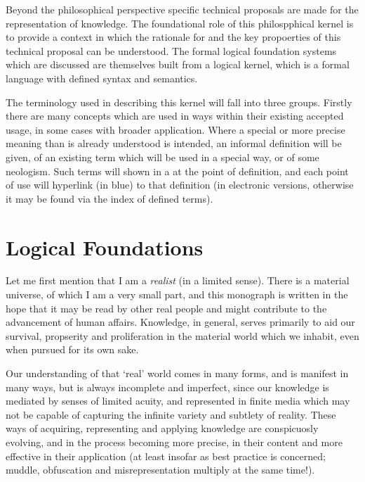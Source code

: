 Beyond the philosophical perspective specific technical proposals are made for the representation of knowledge.
The foundational role of this philospphical kernel is to provide a context in which the rationale for and the key propoerties of this technical proposal can be understood.
The formal logical foundation systems which are discussed are themselves built from a logical kernel, which is a formal language with defined syntax and semantics.

The terminology used in describing this kernel will fall into three 
groups.
Firstly there are many concepts which are used in ways within their existing accepted usage, in some cases with broader application.
Where a special or more precise meaning than is already understood   is intended, an informal definition will be given, of an existing term which will be used in a special way, or of some neologism.
Such terms will shown in a  at the point of definition, and each point of use will hyperlink (in blue) to that definition (in electronic versions, otherwise it may be found via the index of defined terms).

\section{Logical Foundations}

Let me first mention that I am a \emph{realist} (in a limited sense).
There is a material universe, of which I am a very small part, and this monograph is written in the hope that it may be read by other real people and might contribute to the advancement of human affairs.
Knowledge, in general, serves primarily to aid our survival, propserity and proliferation in the material world which we inhabit, even when pursued for its own sake.

Our understanding of that `real'%
world comes in many forms, and is manifest in many ways, but is always incomplete and imperfect, since our knowledge is mediated by senses of limited acuity, and represented in finite media which may not be capable of capturing the infinite variety and subtlety of reality.
These ways of acquiring, representing and applying knowledge are conspicuosly evolving, and in the process becoming more precise, in their content and more effective in their application (at least insofar as best practice is concerned; muddle, obfuscation and misrepresentation multiply at the same time!).

